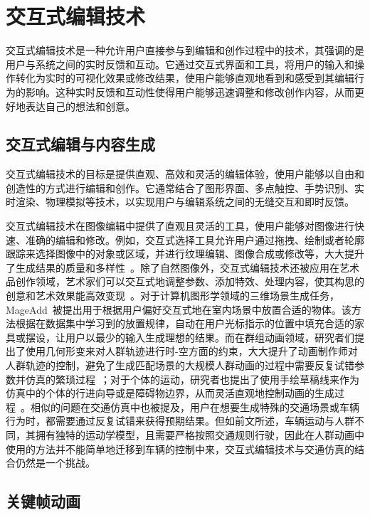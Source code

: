 \section{交互式编辑技术}

交互式编辑技术是一种允许用户直接参与到编辑和创作过程中的技术，其强调的是用户与系统之间的实时反馈和互动。它通过交互式界面和工具，将用户的输入和操作转化为实时的可视化效果或修改结果，使用户能够直观地看到和感受到其编辑行为的影响。这种实时反馈和互动性使得用户能够迅速调整和修改创作内容，从而更好地表达自己的想法和创意。


\subsection{交互式编辑与内容生成}

交互式编辑技术的目标是提供直观、高效和灵活的编辑体验，使用户能够以自由和创造性的方式进行编辑和创作。它通常结合了图形界面、多点触控、手势识别、实时渲染、物理模拟等技术，以实现用户与编辑系统之间的无缝交互和即时反馈。

交互式编辑技术在图像编辑中提供了直观且灵活的工具，使用户能够对图像进行快速、准确的编辑和修改。例如，交互式选择工具允许用户通过拖拽、绘制或者轮廓跟踪来选择图像中的对象或区域，并进行纹理编辑、图像合成或修改等，大大提升了生成结果的质量和多样性~\cite{ruhl2015interactive, dai2021edit}。除了自然图像外，交互式编辑技术还被应用在艺术品创作领域，艺术家们可以交互式地调整参数、添加特效、处理内容，使其构思的创意和艺术效果能高效变现~\cite{huang2022caripainter}。对于计算机图形学领域的三维场景生成任务，MageAdd~\cite{zhang2021mageadd}被提出用于根据用户偏好交互式地在室内场景中放置合适的物体。该方法根据在数据集中学习到的放置规律，自动在用户光标指示的位置中填充合适的家具或摆设，让用户以最少的输入生成理想的结果。而在群组动画领域，研究者们提出了使用几何形变来对人群轨迹进行时-空方面的约束，大大提升了动画制作师对人群轨迹的控制，避免了生成匹配场景的大规模人群动画的过程中需要反复试错参数并仿真的繁琐过程~\cite{kim2014interactive, zhang2020crowd}；对于个体的运动，研究者也提出了使用手绘草稿线来作为仿真中的个体的行进向导或是障碍物边界，从而灵活直观地控制动画的生成过程~\cite{montana2017sketching}。相似的问题在交通仿真中也被提及，用户在想要生成特殊的交通场景或车辆行为时，都需要通过反复试错来获得预期结果。但如前文所述，车辆运动与人群不同，其拥有独特的运动学模型，且需要严格按照交通规则行驶，因此在人群动画中使用的方法并不能简单地迁移到车辆的控制中来，交互式编辑技术与交通仿真的结合仍然是一个挑战。


\subsection{关键帧动画}

